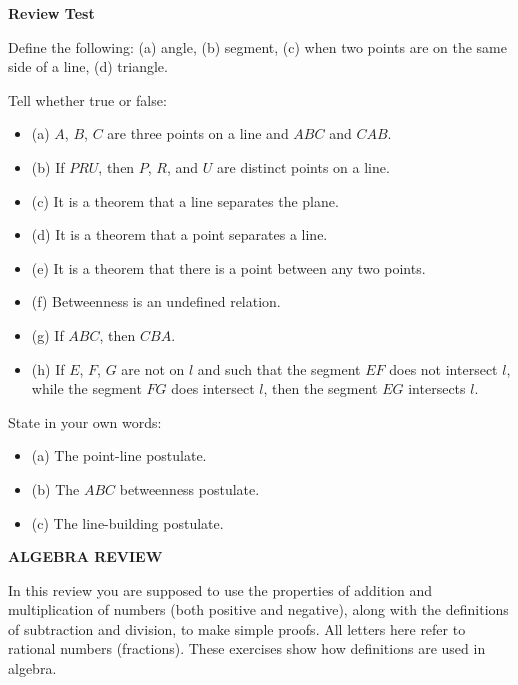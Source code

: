 \documentclass[11pt]{book}
\theoremstyle{bkplain}
\theoremstyle{XIplainnote}
\theoremstyle{bkplain}
\theoremstyle{bkplain}
\begin{document}
\begin{center}\bfseries Review Test\end{center}

\begin{exlist}
\item Define the following: (a) angle, (b) segment, (c) when two points are on
      the same side of a line, (d) triangle.
\item Tell whether true or false:
      \begin{itemize}[label=,leftmargin=1.4em,itemsep=1pt,topsep=2pt]
      \item (a) $A$, $B$, $C$ are three points on a line and $ABC$ and $CAB$.
      \item (b) If $PRU$, then $P$, $R$, and $U$ are distinct points on a line.
      \item (c) It is a theorem that a line separates the plane.
      \item (d) It is a theorem that a point separates a line.
      \item (e) It is a theorem that there is a point between any two points.
      \item (f) Betweenness is an undefined relation.
      \item (g) If $ABC$, then $CBA$.
      \item (h) If $E$, $F$, $G$ are not on $l$ and such that the segment $EF$
            does not intersect $l$, while the segment $FG$ does intersect $l$,
            then the segment $EG$ intersects $l$.
      \end{itemize}
\item State in your own words:
      \begin{itemize}[label=,leftmargin=1.4em,itemsep=1pt,topsep=2pt]
      \item (a) The point-line postulate.
      \item (b) The $ABC$ betweenness postulate.
      \item (c) The line-building postulate.
      \end{itemize}
\end{exlist}

\begin{center}\bfseries ALGEBRA REVIEW\end{center}

In this review you are supposed to use the properties of addition and
multiplication of numbers (both positive and negative), along with the
definitions of subtraction and division, to make simple proofs. All letters here
refer to rational numbers (fractions). These exercises show how definitions are
used in algebra.
\end{document}

